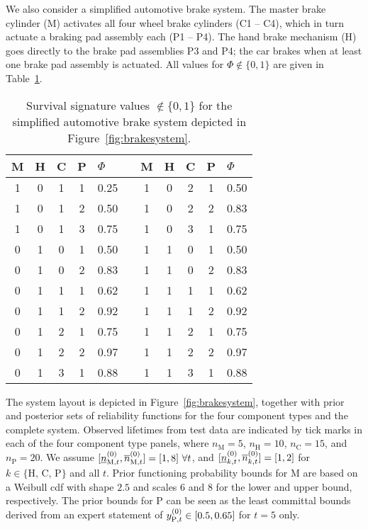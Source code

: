 \documentclass[12pt, a4paper]{elsarticle}
\begin{document}
We also consider a simplified automotive brake system.
The master brake cylinder (M) activates all four wheel brake cylinders (C1 -- C4),
which in turn actuate a braking pad assembly each (P1 -- P4).
The hand brake mechanism (H) goes directly to the brake pad assemblies P3 and P4;
the car brakes when at least one brake pad assembly is actuated.
All values for $\Phi \not\in \{0,1\}$ are given in Table~\ref{tab:brake-survsign}.
\begin{table}
\centering
\begin{tabular}{cccclcccccl}
  \toprule
M & H & C & P & $\Phi$ & \quad & M & H & C & P & $\Phi$\\ 
  \midrule
1 & 0 & 1 & 1 & 0.25 & & 1 & 0 & 2 & 1 & 0.50 \\ 
1 & 0 & 1 & 2 & 0.50 & & 1 & 0 & 2 & 2 & 0.83 \\ 
1 & 0 & 1 & 3 & 0.75 & & 1 & 0 & 3 & 1 & 0.75 \\ 
0 & 1 & 0 & 1 & 0.50 & & 1 & 1 & 0 & 1 & 0.50 \\ 
0 & 1 & 0 & 2 & 0.83 & & 1 & 1 & 0 & 2 & 0.83 \\ 
0 & 1 & 1 & 1 & 0.62 & & 1 & 1 & 1 & 1 & 0.62 \\ 
0 & 1 & 1 & 2 & 0.92 & & 1 & 1 & 1 & 2 & 0.92 \\ 
0 & 1 & 2 & 1 & 0.75 & & 1 & 1 & 2 & 1 & 0.75 \\ 
0 & 1 & 2 & 2 & 0.97 & & 1 & 1 & 2 & 2 & 0.97 \\ 
0 & 1 & 3 & 1 & 0.88 & & 1 & 1 & 3 & 1 & 0.88 \\ 
   \bottomrule
\end{tabular}
\caption{Survival signature values $\not\in \{0,1\}$ for the simplified automotive brake system depicted in Figure~\ref{fig:brakesystem}.
}
\label{tab:brake-survsign}
\end{table}
The system layout is depicted in Figure~\ref{fig:brakesystem},
together with prior and posterior sets of reliability functions for the four component types and the complete system.
Observed lifetimes from test data are indicated by tick marks in each of the four component type panels,
where $n_\text{M}=5$, $n_\text{H}=10$, $n_\text{C}=15$, and $n_\text{P}=20$.
We assume $[\underline{n}^{(0)}_{\text{M},t},\overline{n}^{(0)}_{\text{M},t}] = [1,8]\ \forall t$,
and $[\underline{n}^{(0)}_{k,t}, \overline{n}^{(0)}_{k,t}] = [1,2]$ for $k \in \{\text{H, C, P}\}$ and all $t$.
Prior functioning probability bounds for M are based on
a Weibull cdf with shape $2.5$ and scales $6$ and $8$ for the lower and upper bound, respectively.
The prior bounds for P can be seen as the least committal bounds
derived from an expert statement of $y^{(0)}_{\text{P},t} \in [0.5, 0.65]$ for $t=5$ only.
\end{document}
